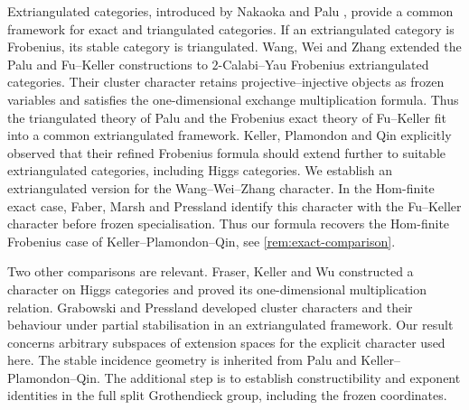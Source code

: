 \documentclass[11pt,reqno]{article}
\numberwithin{equation}{section}
\theoremstyle{definition}
\begin{document}
Extriangulated categories, introduced by Nakaoka and Palu \cite{NakaokaPalu}, provide a common framework for exact and triangulated categories.  If an extriangulated category is Frobenius, its stable category is triangulated.  Wang, Wei and Zhang \cite{WangWeiZhangCC} extended the Palu and Fu--Keller constructions to $2$-Calabi--Yau Frobenius extriangulated categories. Their cluster character retains projective--injective objects as frozen variables and satisfies the one-dimensional exchange multiplication formula.  Thus the triangulated theory of Palu and the Frobenius exact theory of Fu--Keller fit into a common extriangulated framework.  Keller, Plamondon and Qin \cite{KellerPlamondonQin} explicitly observed that their refined Frobenius formula should extend further to suitable extriangulated categories, including Higgs categories.  We establish an extriangulated version for the Wang--Wei--Zhang character. In the Hom-finite exact case, Faber, Marsh and Pressland \cite[Proposition~5.4]{FaberMarshPressland} identify this character with the Fu--Keller character before frozen specialisation. Thus our formula recovers the Hom-finite Frobenius case of Keller--Plamondon--Qin, see \cref{rem:exact-comparison}.

Two other comparisons are relevant. Fraser, Keller and Wu \cite[Section~5]{FraserKellerWu} constructed a character on Higgs categories and proved its one-dimensional multiplication relation. Grabowski and Pressland \cite[Propositions~5.22 and~5.28]{GrabowskiPressland} developed cluster characters and their behaviour under partial stabilisation in an extriangulated framework. Our result concerns arbitrary subspaces of extension spaces for the explicit character used here. The stable incidence geometry is inherited from Palu and Keller--Plamondon--Qin. The additional step is to establish constructibility and exponent identities in the full split Grothendieck group, including the frozen coordinates.
\end{document}
